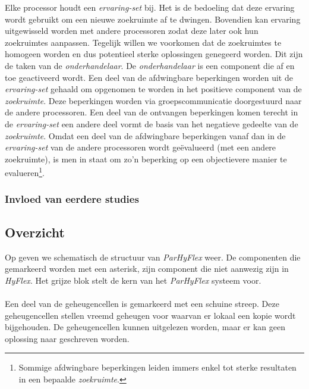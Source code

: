 Elke processor houdt een \emph{ervaring-set} bij. Het is de bedoeling dat deze ervaring wordt gebruikt om een nieuwe zoekruimte af te dwingen. Bovendien kan ervaring uitgewisseld worden met andere processoren zodat deze later ook hun zoekruimtes aanpassen. Tegelijk willen we voorkomen dat de zoekruimtes te homogeen worden en dus potentieel sterke oplossingen genegeerd worden. Dit zijn de taken van de \emph{onderhandelaar}. De \emph{onderhandelaar} is een component die af en toe geactiveerd wordt. Een deel van de afdwingbare beperkingen worden uit de \emph{ervaring-set} gehaald om opgenomen te worden in het positieve component van de \emph{zoekruimte}. Deze beperkingen worden via groepscommunicatie doorgestuurd naar de andere processoren. Een deel van de ontvangen beperkingen komen terecht in de \emph{ervaring-set} een andere deel vormt de basis van het negatieve gedeelte van de \emph{zoekruimte}. Omdat een deel van de afdwingbare beperkingen vanaf dan in de \emph{ervaring-set} van de andere processoren wordt ge\"evalueerd (met een andere zoekruimte), is men in staat om zo'n beperking op een objectievere manier te evalueren\footnote{Sommige afdwingbare beperkingen leiden immers enkel tot sterke resultaten in een bepaalde \emph{zoekruimte}.}.

\subsubsection{Invloed van eerdere studies}



\subsection{Overzicht}

Op  geven we schematisch de structuur van \emph{ParHyFlex} weer.	De componenten die gemarkeerd worden met een asterisk, zijn component die niet aanwezig zijn in \emph{HyFlex}. Het grijze blok stelt de kern van het \emph{ParHyFlex} systeem voor.%

\paragraph{}
Een deel van de geheugencellen is gemarkeerd met een schuine streep. Deze geheugencellen stellen vreemd geheugen voor waarvan er lokaal een kopie wordt bijgehouden. De geheugencellen kunnen uitgelezen worden, maar er kan geen oplossing naar geschreven worden.

